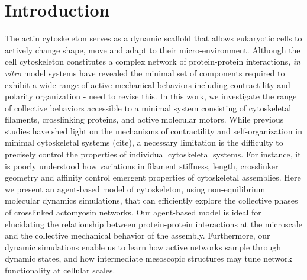 \documentclass[11pt]{article}
\begin{document}
\section*{Introduction} 
The actin cytoskeleton serves as a {\color{red}dynamic} scaffold that allows {\color{red}eukaryotic} cells to {\color{red}actively change shape, move} and {\color{red}adapt} to their {\color{red}micro-}environment. Although {\color{red}the cell cytoskeleton constitutes} a complex network of protein-protein interactions, {\em in vitro} {\color{red}model systems have revealed the minimal set} of components required to exhibit a wide range of {\color{red}active mechanical} behaviors including contractility and {\color{red}polarity organization}{\color{blue}\cite{stricker2010, murrell2012} - need to revise this}. In this work, we {\color{red}investigate} the range of {\color{red}collective} behaviors {\color{red}accessible} to a {\color{red}minimal} system consisting of {\color{red}cytoskeletal} filaments, crosslinking proteins, and active {\color{red}molecular} motors. {\color{red}While previous studies have shed light on the mechanisms of contractility and self-organization in minimal cytoskeletal systems (cite)}, a necessary limitation is the difficulty to precisely control the properties of {\color{red}individual cytoskeletal systems}. For {\color{red}instance, it is poorly understood how variations in} filament stiffness, length, crosslinker {\color{red}geometry} and affinity {\color{red}control emergent properties of cytoskeletal assemblies}. {\color{red}Here we} present an {\color{red}agent-based model of cytoskeleton}, {\color{red}using} non-equilibrium molecular dynamics simulations, that can efficiently explore the {\color{red}collective} phases of {\color{red}crosslinked actomyosin networks}. {\color{red}Our agent-based} model {\color{red}is ideal for elucidating} the relationship between protein-protein interactions {\color{red}at the microscale} and the {\color{red}collective} mechanical {\color{red}behavior} of the {\color{red}assembly}. {\color{red}Furthermore, our dynamic simulations} enable us to learn {\color{red}how active networks sample through dynamic states}, and how intermediate mesoscopic structures {\color{red}may} tune network functionality {\color{red}at cellular scales}.
\par
\end{document}
